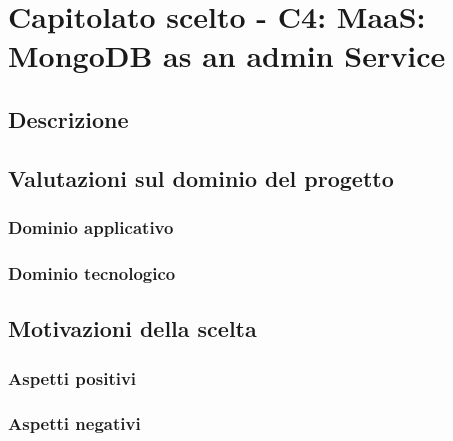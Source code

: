 \section{Capitolato scelto - C4: MaaS: MongoDB as an admin Service}
\subsection{Descrizione}

\subsection{Valutazioni sul dominio del progetto}
\subsubsection{Dominio applicativo}

\subsubsection{Dominio tecnologico}
\begin{itemize}
\end{itemize}


\subsection{Motivazioni della scelta}
\subsubsection{Aspetti positivi}

\subsubsection{Aspetti negativi}

